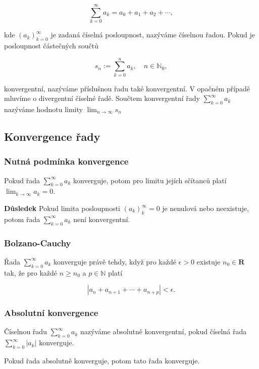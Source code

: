 \documentclass{szzclass}
\begin{document}
\begin{equation*}
\sum_{k=0}^\infty a_k = a_0 + a_1 + a_2 + \cdots,\end{equation*}

kde $(a_k)_{k=0}^\infty$ je zadaná číselná posloupnost,
nazýváme číselnou řadou. Pokud je posloupnost částečných součtů

\begin{equation*}
s_n := \sum_{k=0}^n a_k, \quad n\in\mathbb{N}_0,\end{equation*}

konvergentní, nazýváme příslušnou řadu také konvergentní.
V opačném případě mluvíme o divergentní číselné řadě.
Součtem konvergentní řady $\sum_{k=0}^\infty a_k$
nazýváme hodnotu limity $\displaystyle\lim_{n\to\infty} s_n$


\subsection{Konvergence řady}
\subsubsection{Nutná podmínka konvergence}
Pokud řada $\sum_{k=0}^\infty a_k$ konverguje,
potom pro limitu jejích sčítanců platí
$\displaystyle \lim_{k\to\infty} a_k = 0$.

\textbf{Důsledek}
Pokud limita posloupnosti $(a_k)^∞_k=0$ je
nenulová nebo neexistuje, potom řada
$\sum_{k=0}^\infty a_k$ není konvergentní.

\subsubsection{Bolzano-Cauchy}
Řada $\displaystyle\sum_{k=0}^\infty a_k$
konverguje právě tehdy, když pro každé
$\epsilon>0$ existuje $n_0\in\textbf{R}$
tak, že pro každé $n\geq n_0$ a $p\in\mathbb{N}$ platí

\begin{equation*}
|a_n + a_{n+1} + \cdots + a_{n+p}| < \epsilon .\end{equation*}

\subsubsection{Absolutní konvergence}

Číselnou řadu $\sum_{k=0}^\infty a_k$ nazýváme absolutně
konvergentní, pokud číselná řada $\sum_{k=0}^\infty |a_k|$ konverguje.

Pokud řada absolutně konverguje, potom tato řada konverguje.
\end{document}
